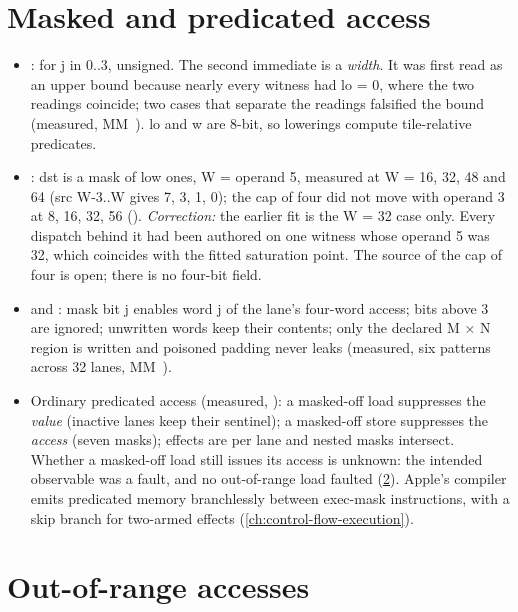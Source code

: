 \section{Masked and predicated access}\label{sec:masks-predicated-memory}

\begin{itemize}
\item {}:  for j in 0..3, unsigned. The second
  immediate is a \emph{width}. It was first read as an upper bound because nearly every witness had lo = 0, where the two
  readings coincide; two cases that separate the readings falsified the bound (measured, MM~). lo and w are 8-bit, so lowerings compute
  tile-relative predicates.
\item {}: dst is a mask of  low ones, W = operand 5, measured at
  W = 16, 32, 48 and 64 (src W-3..W gives 7, 3, 1, 0); the cap of four did not move with operand 3 at 8, 16, 32, 56
  (). \emph{Correction:} the earlier fit  is the W = 32 case
  only. Every dispatch behind it had been authored on one witness whose operand 5 was 32, which coincides with the fitted
  saturation point. The source of the cap of four is open; there is no four-bit field.
\item {} and : mask bit j enables word j of the lane's
  four-word access; bits above 3 are ignored; unwritten words keep their contents; only the declared M × N region is
  written and poisoned padding never leaks (measured, six patterns across 32 lanes, MM~).
\item Ordinary predicated access (measured, ): a masked-off load suppresses the \emph{value} (inactive
  lanes keep their sentinel); a masked-off store suppresses the \emph{access} (seven masks); effects are per lane and nested
  masks intersect. Whether a masked-off load still issues its access is unknown: the intended observable was a fault,
  and no out-of-range load faulted (\cref{sec:out-of-range-accesses-observed}). Apple's compiler emits predicated
  memory branchlessly between exec-mask instructions, with a skip branch for two-armed effects (\cref{ch:control-flow-execution}).
\end{itemize}

\section{Out-of-range accesses}\label{sec:out-of-range-accesses-observed}

